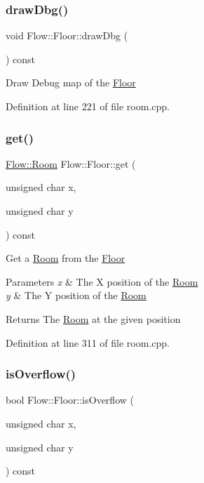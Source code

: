\subsubsection{\texorpdfstring{draw\+Dbg()}{drawDbg()}}
{\footnotesize\ttfamily void Flow\+::\+Floor\+::draw\+Dbg (\begin{DoxyParamCaption}{ }\end{DoxyParamCaption}) const}

Draw Debug map of the \hyperlink{class_flow_1_1_floor}{Floor} 

Definition at line 221 of file room.\+cpp.

\hypertarget{class_flow_1_1_floor_a167e37ebab4947cdc191890647ff99e6}{}\label{class_flow_1_1_floor_a167e37ebab4947cdc191890647ff99e6} 
\subsubsection{\texorpdfstring{get()}{get()}}
{\footnotesize\ttfamily \hyperlink{class_flow_1_1_room}{Flow\+::\+Room} Flow\+::\+Floor\+::get (\begin{DoxyParamCaption}\item[{unsigned char}]{x,  }\item[{unsigned char}]{y }\end{DoxyParamCaption}) const}

Get a \hyperlink{class_flow_1_1_room}{Room} from the \hyperlink{class_flow_1_1_floor}{Floor} 
\begin{DoxyParams}{Parameters}
{\em x} & The X position of the \hyperlink{class_flow_1_1_room}{Room} \\
\hline
{\em y} & The Y position of the \hyperlink{class_flow_1_1_room}{Room} \\
\hline
\end{DoxyParams}
\begin{DoxyReturn}{Returns}
The \hyperlink{class_flow_1_1_room}{Room} at the given position 
\end{DoxyReturn}


Definition at line 311 of file room.\+cpp.

\hypertarget{class_flow_1_1_floor_a649041679a73f38cf92ef7082c885795}{}\label{class_flow_1_1_floor_a649041679a73f38cf92ef7082c885795} 
\subsubsection{\texorpdfstring{is\+Overflow()}{isOverflow()}}
{\footnotesize\ttfamily bool Flow\+::\+Floor\+::is\+Overflow (\begin{DoxyParamCaption}\item[{unsigned char}]{x,  }\item[{unsigned char}]{y }\end{DoxyParamCaption}) const}

